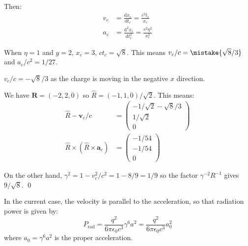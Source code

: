 \documentclass[12pt]{article}
\begin{document}
Then:
\begin{equation}
    \begin{split}
        v_{c} &= \frac{\mathrm{d}x_{c}}{\mathrm{d}t_{c}} = \frac{c^{2} t_{c}}{x_{c}} \\
        a_{c} &= \frac{\mathrm{d}^{2}x_{c}}{\mathrm{d}t_{c}^{2}} = \frac{c^{2} \eta^{2}}{x_{c}^{3}}
    \end{split}
\end{equation}

When $\eta = 1$ and $y = 2$, $x_{c} = 3$, $c t_{c} = \sqrt{8}$. This means $v_{c}/c = \mistake{\sqrt{8}/3}$ and $a_{c}/c^{2} = 1/27$.

\begin{correction}
    $v_{c}/c = -\sqrt{8}/3$ as the charge is moving in the negative $x$ direction.
\end{correction}

We have $\mathbf{R} = (-2, 2, 0)$ so $\hat{R} = (-1, 1, 0)/\sqrt{2}$. This means:
\begin{equation}
    \begin{split}
        \hat{R} - \mathbf{v}_{c}/c &=
        \begin{pmatrix}
            -1/\sqrt{2} - \sqrt{8}/3 \\
            1/\sqrt{2}               \\
            0
        \end{pmatrix} \\
        \hat{R} \times (\hat{R} \times \mathbf{a}_{c}) &=
        \begin{pmatrix}
            -1/54 \\
            -1/54 \\
            0
        \end{pmatrix}
    \end{split}
\end{equation}

On the other hand, $\gamma^{2} = 1 - v_{c}^{2}/c^{2} = 1 - 8/9 = 1/9$ so the factor $\gamma^{-2} R^{-1}$ gives $9/\sqrt{8}$.
\qed



In the current case, the velocity is parallel to the acceleration, so that radiation power is given by:
\begin{equation}
    P_{\text{rad}} = \frac{q^{2}}{6\pi \epsilon_{0} c^{3}} \gamma^{6} a^{2} = \frac{q^{2}}{6\pi \epsilon_{0} c^{3}} a_{0}^{2}
\end{equation}
where $a_{0} = \gamma^{6} a^{2}$ is the proper acceleration.
\end{document}
